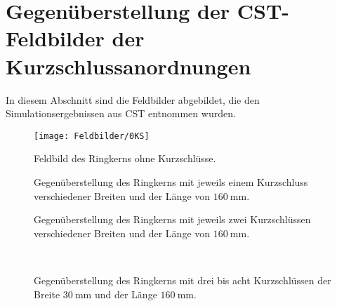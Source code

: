 \section{Gegen\"uberstellung der CST-Feldbilder der Kurzschlussanordnungen}
\label{sec:allfieldplots}
In diesem Abschnitt sind die Feldbilder abgebildet, die den Simulationsergebnissen aus CST entnommen wurden.
\begin{figure}[htb]
	\centering
	\texttt{[image: Feldbilder/0KS]}
	\caption{Feldbild des Ringkerns ohne Kurzschl\"usse.}
	\label{fig:field0ks}
\end{figure}

\begin{figure}[htb]
	\centering
	\caption{Gegen\"uberstellung des Ringkerns mit jeweils einem Kurzschluss verschiedener Breiten und der Länge von $\SI{160}{\milli\meter}$.}
	\label{fig:field1ks}
\end{figure}

\begin{figure}[htb]
	\centering
	\caption{Gegen\"uberstellung des Ringkerns mit jeweils zwei Kurzschl\"ussen verschiedener Breiten und der Länge von $\SI{160}{\milli\meter}$.}
	\label{fig:field2ks}
\end{figure}

\begin{figure}[htb]
	\centering
    \\
	\caption{Gegen\"uberstellung des Ringkerns mit drei bis acht Kurzschl\"ussen der Breite $\SI{30}{\milli\meter}$ und der Länge $\SI{160}{\milli\meter}$.}
	\label{fig:field3bis8ks}
\end{figure}
